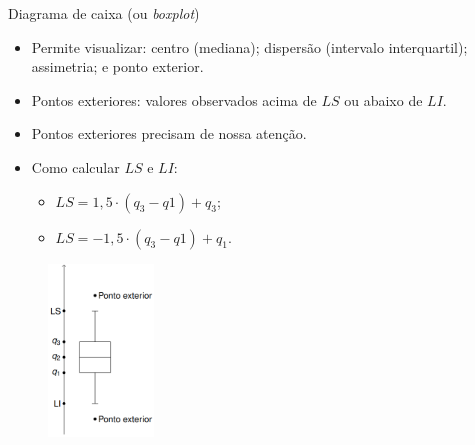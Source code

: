 \documentclass[
  10pt,
  ignorenonframetext,
]{beamer}
\providecommand{\tightlist}{%
  \setlength{\itemsep}{0pt}\setlength{\parskip}{0pt}}\usepackage{longtable,booktabs,array}
\begin{document}
\begin{frame}{Diagrama de caixa (ou \emph{boxplot})}
\protect\hypertarget{diagrama-de-caixa-ou-boxplot}{}
\begin{itemize}
\tightlist
\item
  Permite visualizar: centro (mediana); dispersão (intervalo
  interquartil); assimetria; e ponto exterior.
\item
  Pontos exteriores: valores observados acima de \(LS\) ou abaixo de
  \(LI\).
\item
  Pontos exteriores precisam de nossa atenção.
\item
  Como calcular \(LS\) e \(LI\):

  \begin{itemize}
  \tightlist
  \item
    \(LS = 1,5 \cdot (q_3 - q1) + q_3\);
  \item
    \(LS = -1,5 \cdot (q_3 - q1) + q_1\).
  \end{itemize}
\end{itemize}

\begin{figure}

{\centering \includegraphics[width=0.25\textwidth,height=\textheight]{boxplot.png}

}

\end{figure}
\end{frame}
\end{document}
